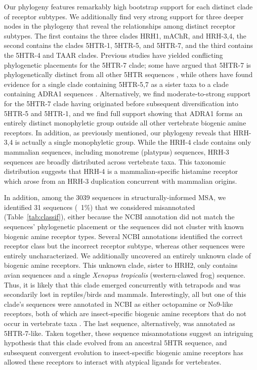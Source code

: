 \documentclass[fleqn,10pt]{wlpeerj}
\begin{document}
Our phylogeny features remarkably high bootstrap support for each distinct clade of receptor subtypes. We additionally find very strong support for three deeper nodes in the phylogeny that reveal the relationships among distinct receptor subtypes. The first contains the three clades HRH1, mAChR, and HRH-3,4, the second contains the clades 5HTR-1, 5HTR-5, and 5HTR-7, and the third contains the 5HTR-4 and TAAR clades. Previous studies have yielded conflicting phylogenetic placements for the 5HTR-7 clade; some have argued that 5HTR-7 is phylogenetically distinct from all other 5HTR sequences \citep{KakaralaJamil2014}, while others have found evidence for a single clade containing 5HTR-5,7 as a sister taxa to a clade containing ADRA1 sequences \citep{Fredrikssonetal2003}. Alternatively, we find moderate-to-strong support for the 5HTR-7 clade having originated before subsequent diversification into 5HTR-5 and 5HTR-1, and we find full support showing that ADRA1 forms an entirely distinct monophyletic group outside all other vertebrate biogenic amine receptors. In addition, as previously mentioned, our phylogeny reveals that HRH-3,4 is actually a single monophyletic group. While the HRH-4 clade contains only mammalian sequences, including monotreme (platypus) sequences, HRH-3 sequences are broadly distributed across vertebrate taxa. This taxonomic distribution suggests that HRH-4 is a mammalian-specific histamine receptor which arose from an HRH-3 duplication concurrent with mammalian origins.

In addition, among the 3039 sequences in structurally-informed MSA, we identified 31 sequences (~1\%) that we considered misannotated (Table~\ref{tab:classif}), either because the NCBI annotation did not match the sequences' phylogenetic placement or the sequences did not cluster with known biogenic amine receptor types. Several NCBI annotations identified the correct receptor class but the incorrect receptor subtype, whereas other sequences were entirely uncharacterized. We additionally uncovered an entirely unknown clade of biogenic amine receptors. This unknown clade, sister to HRH2, only contains avian sequences and a single \emph{Xenopus tropicalis} (western-clawed frog) sequence. Thus, it is likely that this clade emerged concurrently with tetrapods and was secondarily lost in reptiles/birds and mammals. Interestingly, all but one of this clade's sequences were annotated in NCBI as either octopamine or No9-like receptors, both of which are insect-specific biogenic amine receptors that do not occur in vertebrate taxa \citep{Roeder2005}. The last sequence, alternatively, was annotated as 5HTR-7-like. Taken together, these sequence misannotations suggest an intriguing hypothesis that this clade evolved from an ancestral 5HTR sequence, and subsequent convergent evolution to insect-specific biogenic amine receptors has allowed these receptors to interact with atypical ligands for vertebrates.
\end{document}
